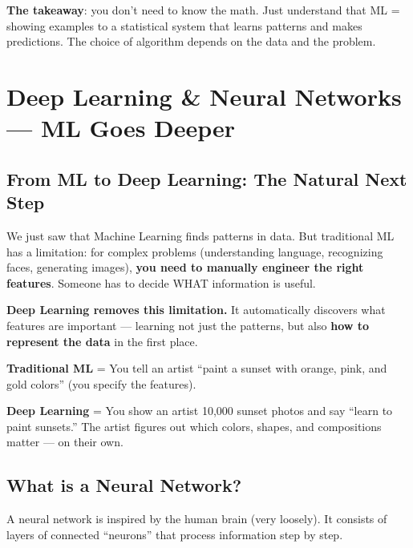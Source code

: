 \documentclass[11pt,a4paper]{report}
\begin{document}
\textbf{The takeaway}: you don't need to know the math. Just understand that ML = showing examples to a statistical system that learns patterns and makes predictions. The choice of algorithm depends on the data and the problem.

\chapter{Deep Learning \& Neural Networks --- ML Goes Deeper}

\section{From ML to Deep Learning: The Natural Next Step}

We just saw that Machine Learning finds patterns in data. But traditional ML has a limitation: for complex problems (understanding language, recognizing faces, generating images), \textbf{you need to manually engineer the right features}. Someone has to decide WHAT information is useful.

\textbf{Deep Learning removes this limitation.} It automatically discovers what features are important --- learning not just the patterns, but also \textbf{how to represent the data} in the first place.

\begin{analogybox}
\textbf{Traditional ML} = You tell an artist ``paint a sunset with orange, pink, and gold colors'' (you specify the features).

\textbf{Deep Learning} = You show an artist 10,000 sunset photos and say ``learn to paint sunsets.'' The artist figures out which colors, shapes, and compositions matter --- on their own.
\end{analogybox}

\section{What is a Neural Network?}

A neural network is inspired by the human brain (very loosely). It consists of layers of connected ``neurons'' that process information step by step.
\end{document}
